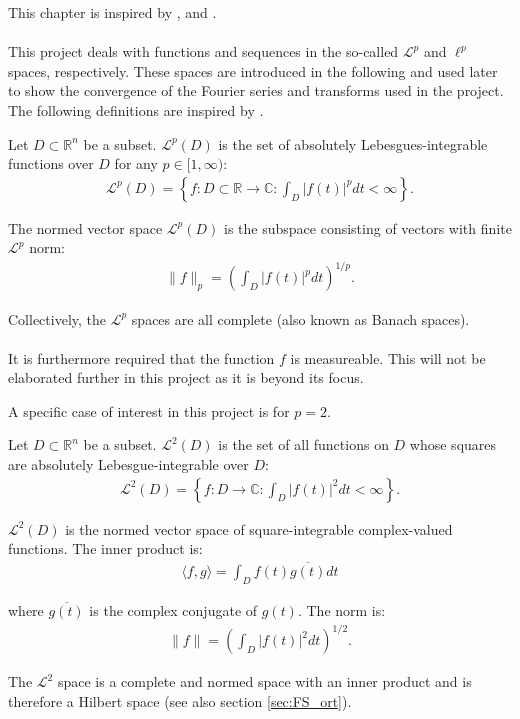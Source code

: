 This chapter is inspired by \cite{FAA}, \cite{FSP} and \cite{FTFA}.
\\ \\
This project deals with functions and sequences in the so-called $\mathcal{L}^p$ and $\ell^p$ spaces, respectively. These spaces are introduced in the following and used later to show the convergence of the Fourier series and transforms used in the project. The following definitions are inspired by \cite{page 31, FSP}.

\begin{definition}
Let $D \subset \mathbb{R}^n$ be a subset. $\mathcal{L}^p(D)$ is the set of absolutely Lebesgues-integrable functions over $D$ for any $p \in [1,\infty)$:
\begin{align*}
\mathcal{L}^p(D) = \left\{ f: D \subset \mathbb{R} \to \mathbb{C}: \int_D |f(t)|^p dt < \infty \right\}.
\end{align*}

The normed vector space $\mathcal{L}^p(D)$ is the subspace consisting of vectors with finite $\mathcal{L}^p$ norm:
\begin{align*}
\|f\|_p = \left( \int_D |f(t)|^p dt \right)^{1/p}.
\end{align*}

Collectively, the $\mathcal{L}^p$ spaces are all complete (also known as Banach spaces).
\\ \\
It is furthermore required that the function $f$ is measureable. This will not be elaborated further in this project as it is beyond its focus.
\end{definition}

A specific case of interest in this project is for $p = 2$.

\begin{definition}
Let $D \subset \mathbb{R}^n$ be a subset. $\mathcal{L}^2(D)$ is the set of all functions on $D$ whose squares are absolutely Lebesgue-integrable over $D$:
\begin{align*}
\mathcal{L}^2(D) = \left\{ f: D \to \mathbb{C}: \int_D |f(t)|^2 dt < \infty \right\}.
\end{align*}

$\mathcal{L}^2(D)$ is the normed vector space of square-integrable complex-valued functions. The inner product is:
\begin{align*}
\langle f,g \rangle =  \int_D f(t) \overline{g(t)} dt
\end{align*}

where $\overline{g(t)}$ is the complex conjugate of $g(t)$. The norm is:
\begin{align*}
\|f\| = \left( \int_D |f(t)|^2 dt \right)^{1/2}.
\end{align*}

The $\mathcal{L}^2$ space is a complete and normed space with an inner product and is therefore a Hilbert space (see also section \ref{sec:FS_ort}).

\end{definition}

